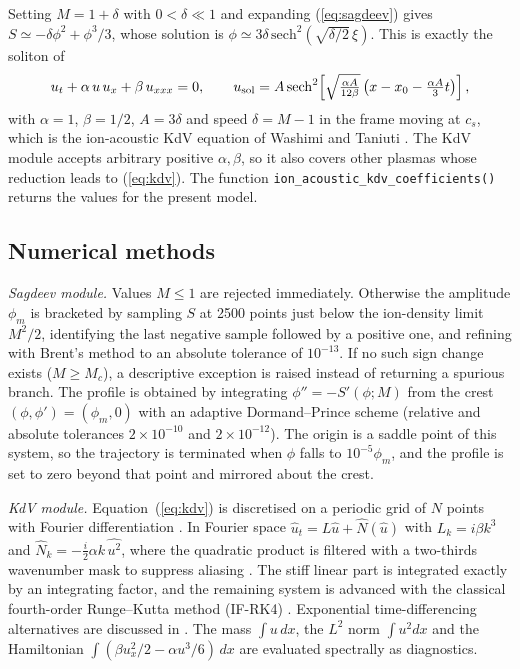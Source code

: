 \documentclass[preprint,12pt]{elsarticle}
\begin{document}
Setting $M=1+\delta$ with $0<\delta\ll1$ and expanding (\ref{eq:sagdeev}) gives
$S\simeq-\delta\phi^2+\phi^3/3$, whose solution is
$\phi\simeq3\delta\,\mathrm{sech}^2(\sqrt{\delta/2}\,\xi)$. This is exactly the
soliton of
\begin{equation}
u_t+\alpha\,u\,u_x+\beta\,u_{xxx}=0,\qquad
u_{\rm sol}=A\,\mathrm{sech}^2\!\left[\sqrt{\tfrac{\alpha A}{12\beta}}
\left(x-x_0-\tfrac{\alpha A}{3}t\right)\right],
\label{eq:kdv}
\end{equation}
with $\alpha=1$, $\beta=1/2$, $A=3\delta$ and speed $\delta=M-1$ in the
frame moving at $c_s$, which is the ion-acoustic KdV equation of Washimi and
Taniuti \cite{WashimiTaniuti1966}. The KdV module accepts arbitrary positive
$\alpha,\beta$, so it also covers other plasmas whose reduction leads to
(\ref{eq:kdv}). The function \texttt{ion\_acoustic\_kdv\_coefficients()} returns
the values for the present model.

\subsection{Numerical methods}
\label{sec:numerics}

\emph{Sagdeev module.} Values $M\le1$ are rejected immediately. Otherwise the
amplitude $\phi_m$ is bracketed by sampling $S$ at 2500 points just below the
ion-density limit $M^2/2$, identifying the last negative sample followed by a
positive one, and refining with Brent's method \cite{Brent1973} to an absolute
tolerance of $10^{-13}$. If no such sign change exists ($M\ge M_c$), a
descriptive exception is raised instead of returning a spurious branch. The profile is
obtained by integrating $\phi''=-S'(\phi;M)$ from the crest
$(\phi,\phi')=(\phi_m,0)$ with an adaptive Dormand--Prince scheme
\cite{DormandPrince1980} (relative and absolute tolerances
$2\times10^{-10}$ and $2\times10^{-12}$). The origin is a saddle point of this
system, so the trajectory is terminated when $\phi$ falls to $10^{-5}\phi_m$,
and the profile is set to zero beyond that point and mirrored about the crest.

\emph{KdV module.} Equation~(\ref{eq:kdv}) is discretised on a periodic grid of
$N$ points with Fourier differentiation \cite{FornbergWhitham1978,Trefethen2000}.
In Fourier space $\hat u_t=L\hat u+\hat N(\hat u)$ with $L_k=i\beta k^3$ and
$\hat N_k=-\tfrac{i}{2}\alpha k\,\widehat{u^2}$, where the quadratic product is
filtered with a two-thirds wavenumber mask to suppress aliasing \cite{Orszag1971}. The stiff linear part is
integrated exactly by an integrating factor, and the remaining system is advanced
with the classical fourth-order Runge--Kutta method (IF-RK4) \cite{Trefethen2000}.
Exponential time-differencing alternatives are discussed in
\cite{CoxMatthews2002,KassamTrefethen2005}. The mass
$\int u\,dx$, the $L^2$ norm $\int u^2dx$ and the Hamiltonian
$\int(\beta u_x^2/2-\alpha u^3/6)\,dx$ are evaluated spectrally as diagnostics.
\end{document}
